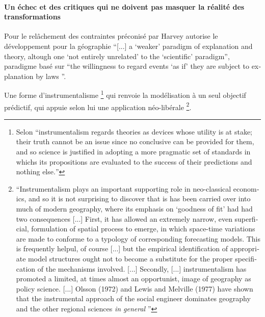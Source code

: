 \paragraph{Un échec et des critiques qui ne doivent pas masquer la réalité des transformations}
\label{p:echec_critiques}


Pour \textcite[41]{Gregory1978} le relâchement des contraintes préconisé par Harvey \autocite[47]{Paterson1984} autorise le développement pour la géographie \foreignquote{english}{[...] a \enquote{weaker} paradigm of explanation and theory, altough one \enquote{not entirely unrelated} to the \enquote{scientific} paradigm}, paradigme basé sur \foreignquote{english}{the willingness to regard events \enquote{as if} they are subject to explanation by laws \autocite[174]{Harvey1969}}.

Une forme d'instrumentalisme \footnote{Selon \textcite{Gregory1978} \foreignquote{english}{instrumentalism regards theories as devices whose utility is at stake; their truth cannot be an issue since no conclusive can be provided for them, and so science is justified in adopting a more pragmatic set of standards in whichs its propositions are evaluated to the success of their predictions and nothing else.}} qui renvoie la modélisation à un seul objectif prédictif, qui appuie selon lui une application néo-libérale \footnote{\foreignquote{english}{Instrumentalism plays an important supporting role in neo-classical economics, and so it is not surprising to discover that is has been carried over into much of modern geography, where its emphasis on \foreignquote{english}{goodness of fit} had had two consequences [...] First, it has allowed an extremely narrow, even superficial, formulation of spatial process to emerge, in which space-time variations are made to conforme to a typology of corresponding forecasting models. This is frequently helpul, of course [...] but the empirical identification of appropriate model structures ought not to become a substitute for the proper specification of the mechanisms involved. [...] Secondly, [...] instrumentalism has promoted a limited, at times almost an opportunist, image of geography as policy science. [...] Olsson (1972) and Lewis and Melville (1977) have shown that the instrumental approach of the social engineer dominates geography and the other regional sciences \textit{in general} \autocite[41]{Gregory1978}}}.


